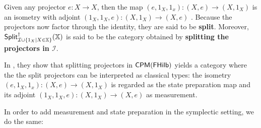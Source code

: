 Given  any projector $e:X\to X$, then the map $(e,1_X, 1_x) :(X,e)\to (X,1_X)$ is an isometry with adjoint $(1_X,1_X, e) :(X,1_X)\to (X,e)$ .
Because the projectors now factor through the identity, they are said to be {\bf split}. Moreover, 
${\sf Split}_{{\mathcal I }\cup \{ 1_X | X \in \mathbb{X}\}}^{\dag}(\mathbb{X})$ is said to be the category obtained by {\bf splitting the projectors in $\mathcal I$}.


In \cite{idempotent}, they show that splitting projectors in $\mathsf{CPM}(\mathsf{FHilb})$ yields a category where the the split projectors can be interpreted as classical types: the isometry  $(e,1_X, 1_x) :(X,e)\to (X,1_X)$ is regarded as the state preparation map and its adjoint $(1_X,1_X, e) :(X,1_X)\to (X,e)$  as measurement.


In order to add measurement and state preparation in the symplectic setting, we do the same:

